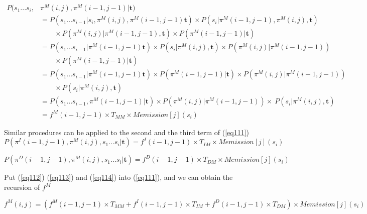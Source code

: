 \documentclass[10pt]{article}
\begin{document}
    
    \begin{equation} \label{eq112}
    \begin{aligned}
      P(s_1...s_i,& \pi^M(i, j), \pi^M(i-1, j-1) | \mathbf{t}) \\
        & = P(s_1...s_{i-1} | s_{i}, \pi^M(i, j), \pi^M(i-1, j-1) \mathbf{t}) \times P(s_{i} | \pi^M(i-1, j-1), \pi^M(i, j), \mathbf{t}) \\
          &\qquad \times P(\pi^M(i, j) | \pi^M(i-1, j-1), \mathbf{t}) \times P(\pi^M(i-1, j-1) | \mathbf{t}) \\
        & = P(s_1...s_{i-1} | \pi^M(i-1, j-1) \mathbf{t}) \times P(s_{i} | \pi^M(i, j), \mathbf{t}) \times P(\pi^M(i, j) | \pi^M(i-1, j-1))\\
          &\qquad \times P(\pi^M(i-1, j-1) | \mathbf{t}) \\
        & = P(s_1...s_{i-1} | \pi^M(i-1, j-1) \mathbf{t}) \times P(\pi^M(i-1, j-1) | \mathbf{t}) \times P(\pi^M(i, j) | \pi^M(i-1, j-1)) \\
          &\qquad \times P(s_{i} | \pi^M(i, j), \mathbf{t}) \\
        & = P(s_1...s_{i-1}, \pi^M(i-1, j-1) | \mathbf{t}) \times P(\pi^M(i, j) | \pi^M(i-1, j-1)) \times\ 
        P(s_{i} | \pi^M(i, j), \mathbf{t}) \\
        & = f^{M}(i-1, j-1) \times T_{MM} \times Memission[j](s_{i})
    \end{aligned}
    \end{equation}

    Similar procedures can be applied to the second and the third term of (\ref{eq111})
    \begin{equation} \label{eq113}
      P(\pi^{I}(i-1, j-1), \pi^M(i, j), s_1...s_{i} | \mathbf{t}) = f^{I}(i-1, j-1) \times T_{IM} \times Memission[j](s_{i})
    \end{equation}

    \begin{equation} \label{eq114}
      P(\pi^{D}(i-1, j-1), \pi^M(i, j), s_1...s_{i} | \mathbf{t}) = f^{D}(i-1, j-1) \times T_{DM} \times Memission[j](s_{i})
    \end{equation}
    
    Put (\ref{eq112}) (\ref{eq113}) and (\ref{eq114}) into (\ref{eq111}), and we can obtain the recursion of $f^{M}$
    
    \begin{equation}
      f^{M}(i, j) = (f^{M}(i-1, j-1) \times T_{MM}  + f^{I}(i-1, j-1) \times T_{IM} + f^{D}(i-1, j-1) \times T_{DM}) \times Memission[j](s_{i})
    \end{equation}
\end{document}
